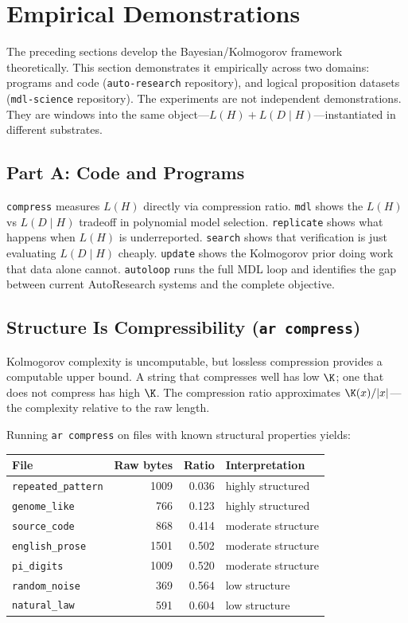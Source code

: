 \section{Empirical Demonstrations}
\label{sec:experiments}

The preceding sections develop the Bayesian/Kolmogorov framework
theoretically. This section demonstrates it empirically across two
domains: programs and code (\texttt{auto-research} repository), and
logical proposition datasets (\texttt{mdl-science} repository). The
experiments are not independent demonstrations. They are windows into
the same object---$L(H) + L(D \mid H)$---instantiated in different
substrates.

\subsection*{Part A: Code and Programs}

\texttt{compress} measures $L(H)$ directly via compression ratio.
\texttt{mdl} shows the $L(H)$ vs $L(D \mid H)$ tradeoff in polynomial
model selection. \texttt{replicate} shows what happens when $L(H)$ is
underreported. \texttt{search} shows that verification is just
evaluating $L(D \mid H)$ cheaply. \texttt{update} shows the Kolmogorov
prior doing work that data alone cannot. \texttt{autoloop} runs the
full MDL loop and identifies the gap between current AutoResearch
systems and the complete objective.

\subsection{Structure Is Compressibility (\texttt{ar compress})}

Kolmogorov complexity is uncomputable, but lossless compression provides
a computable upper bound. A string that compresses well has low $\K$; one
that does not compress has high $\K$. The compression ratio approximates
$\K(x)/|x|$---the complexity relative to the raw length.

Running \texttt{ar compress} on files with known structural properties
yields:

\begin{center}
\begin{tabular}{lrrl}
\toprule
File & Raw bytes & Ratio & Interpretation \\
\midrule
\texttt{repeated\_pattern} & 1009 & 0.036 & highly structured \\
\texttt{genome\_like}      &  766 & 0.123 & highly structured \\
\texttt{source\_code}      &  868 & 0.414 & moderate structure \\
\texttt{english\_prose}    & 1501 & 0.502 & moderate structure \\
\texttt{pi\_digits}        & 1009 & 0.520 & moderate structure \\
\texttt{random\_noise}     &  369 & 0.564 & low structure \\
\texttt{natural\_law}      &  591 & 0.604 & low structure \\
\bottomrule
\end{tabular}
\end{center}

